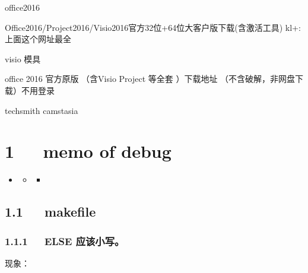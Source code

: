 \documentclass[letterpaper,12pt,english]{sphinxmanual}
\begin{document}
office2016

Office2016/Project2016/Visio2016官方32位+64位大客户版下载(含激活工具)
kl+:上面这个网址最全

visio 模具

office 2016 官方原版 （含Visio Project 等全套 ）下载地址 （不含破解，非网盘下载）不用登录

techsmith camstasia


\chapter{1   memo of debug}
\label{\detokenize{000misc/memo-debug:memo-of-debug}}\label{\detokenize{000misc/memo-debug::doc}}
\begin{sphinxShadowBox}
\begin{itemize}
\item {} 
\label{\detokenize{000misc/memo-debug:id2}}{\hyperref[\detokenize{000misc/memo-debug:memo-of-debug}]{}}
\begin{itemize}
\item {} 
\label{\detokenize{000misc/memo-debug:id3}}{\hyperref[\detokenize{000misc/memo-debug:makefile}]{}}
\begin{itemize}
\item {} 
\label{\detokenize{000misc/memo-debug:id4}}{\hyperref[\detokenize{000misc/memo-debug:else}]{}}

\end{itemize}

\end{itemize}

\end{itemize}
\end{sphinxShadowBox}


\section{1.1   makefile}
\label{\detokenize{000misc/memo-debug:makefile}}

\subsection{1.1.1   ELSE 应该小写。}
\label{\detokenize{000misc/memo-debug:else}}
现象：
\end{document}
